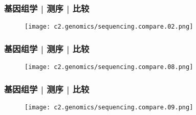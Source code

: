 \begin{frame}
  \frametitle{基因组学 | 测序 | 比较}
  \begin{figure}
    \centering
    \texttt{[image: c2.genomics/sequencing.compare.02.png]}
  \end{figure}
\end{frame}

\begin{frame}
  \frametitle{基因组学 | 测序 | 比较}
  \begin{figure}
    \centering
    \texttt{[image: c2.genomics/sequencing.compare.08.png]}
  \end{figure}
\end{frame}

\begin{frame}
  \frametitle{基因组学 | 测序 | 比较}
  \begin{figure}
    \centering
    \texttt{[image: c2.genomics/sequencing.compare.09.png]}
  \end{figure}
\end{frame}

